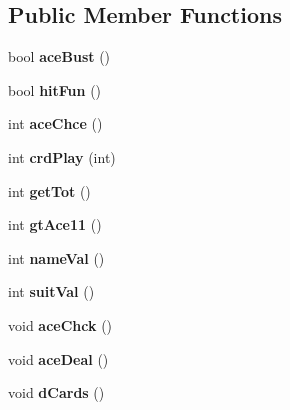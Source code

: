 \subsection*{Public Member Functions}
\begin{DoxyCompactItemize}
\item 
\mbox{\label{class_player_a5ee2fc3599f06dada0e481f015671798}} 
bool {\bfseries ace\+Bust} ()
\item 
\mbox{\label{class_player_a855c923ad57bbab56a4a7fe5305a85ce}} 
bool {\bfseries hit\+Fun} ()
\item 
\mbox{\label{class_player_a829b77171f5f437f4966dc6e1da7f1ff}} 
int {\bfseries ace\+Chce} ()
\item 
\mbox{\label{class_player_ae9d752cc3debd94afd0630cb9b3f18bb}} 
int {\bfseries crd\+Play} (int)
\item 
\mbox{\label{class_player_a1593dac5b1f7bdb1047c8541a1be7a6e}} 
int {\bfseries get\+Tot} ()
\item 
\mbox{\label{class_player_a45ba804d54acfb9d19e0adec39d99c82}} 
int {\bfseries gt\+Ace11} ()
\item 
\mbox{\label{class_player_a73f53e0498bdc7d7f1e6a2e524bcb3b6}} 
int {\bfseries name\+Val} ()
\item 
\mbox{\label{class_player_a6b0d87936086fdb39356402c19aa78a8}} 
int {\bfseries suit\+Val} ()
\item 
\mbox{\label{class_player_ab4cbc41ae864cdc9ac8a21257f7777ee}} 
void {\bfseries ace\+Chck} ()
\item 
\mbox{\label{class_player_a1ab5f426b4306952dfdcc99797a3f28d}} 
void {\bfseries ace\+Deal} ()
\item 
\mbox{\label{class_player_aaf286d10cd53b5af985f24405450f72b}} 
void {\bfseries d\+Cards} ()
\item 
\mbox{\label{class_player_a89b36aefbee016061e66b78650d21e5f}} 

\end{DoxyCompactItemize}
